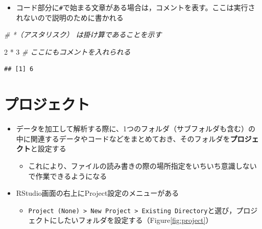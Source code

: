 \documentclass[
  xelatex,ja=standard, b5paper]{bxjsbook}
\newenvironment{Shaded}{\begin{snugshade}}{\end{snugshade}}
\newcommand{\CommentTok}[1]{\textcolor[rgb]{0.56,0.35,0.01}{\textit{#1}}}
\newcommand{\DecValTok}[1]{\textcolor[rgb]{0.00,0.00,0.81}{#1}}
\newcommand{\SpecialCharTok}[1]{\textcolor[rgb]{0.00,0.00,0.00}{#1}}
\providecommand{\tightlist}{%
  \setlength{\itemsep}{0pt}\setlength{\parskip}{0pt}}
\begin{document}
\begin{itemize}
\tightlist
\item
  コード部分に\texttt{\#}で始まる文章がある場合は，コメントを表す。ここは実行されないので説明のために書かれる
\end{itemize}

\begin{Shaded}
\begin{Highlighting}[]
\CommentTok{\# *（アスタリスク） は掛け算であることを示す}

\DecValTok{2} \SpecialCharTok{*} \DecValTok{3}  \CommentTok{\# ここにもコメントを入れられる}
\end{Highlighting}
\end{Shaded}

\begin{verbatim}
## [1] 6
\end{verbatim}

\hypertarget{p-project}{%
\section{プロジェクト}\label{p-project}}

\begin{itemize}
\tightlist
\item
  データを加工して解析する際に、1つのフォルダ（サブフォルダも含む）の中に関連するデータやコードなどをまとめておき、そのフォルダを\textbf{プロジェクト}と設定する

  \begin{itemize}
  \tightlist
  \item
    これにより、ファイルの読み書きの際の場所指定をいちいち意識しないで作業できるようになる
  \end{itemize}
\item
  RStudio画面の右上にProject設定のメニューがある

  \begin{itemize}
  \tightlist
  \item
    \texttt{Project\ (None)\ \textgreater{}\ New\ Project\ \textgreater{}\ Existing\ Directory}と選び，プロジェクトにしたいフォルダを設定する（Figure\ref{fig:project}）
  \end{itemize}
\end{itemize}
\end{document}
